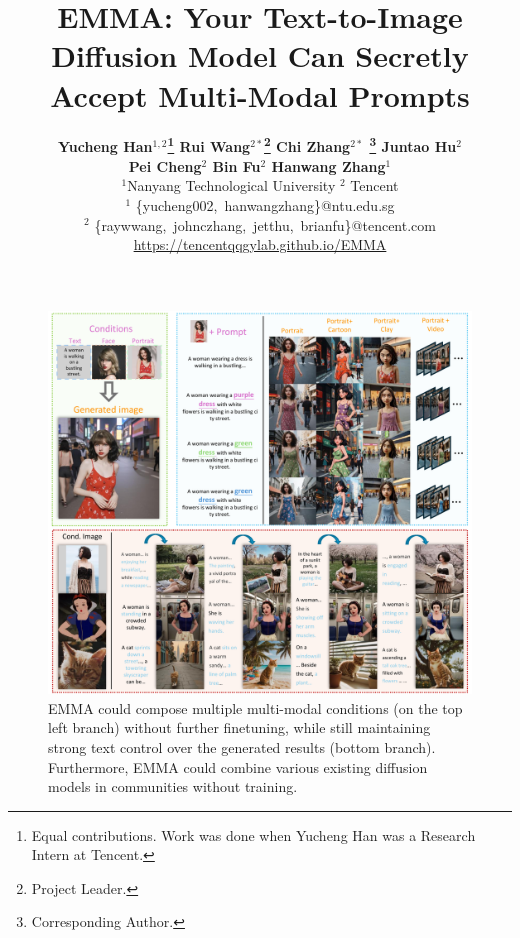 \documentclass{article}
\title{EMMA: Your Text-to-Image Diffusion Model Can Secretly Accept Multi-Modal Prompts
}
\author{\textbf{Yucheng Han$^{1,2}$\thanks{Equal contributions. Work was done when Yucheng Han was a Research Intern at Tencent.} 
\quad
Rui Wang$^{2\ast}$\thanks{Project Leader.}
\quad 
Chi Zhang$^{2\ast}$ \thanks{Corresponding Author. }
\quad Juntao Hu$^{2}$ } \\ \textbf{ Pei Cheng$^2$ \quad Bin Fu$^2$ \quad Hanwang Zhang$^1$ }\vspace{0.3em} \\
{\normalsize $^1$Nanyang Technological University} \quad
{\normalsize $^2$ Tencent} \\
{\normalsize $^1$ \{yucheng002,~hanwangzhang\}@ntu.edu.sg}  \\
{\normalsize $^2$ \{raywwang,~johnczhang,~jetthu,~brianfu\}@tencent.com} \\
\url{https://tencentqqgylab.github.io/EMMA}
}
\begin{document}
\maketitle

\begin{figure}[h]
    \centering
    \includegraphics[width=.95\textwidth]{images/emma_teaser_v2.pdf}
    \caption{EMMA could compose multiple multi-modal conditions (on the top left branch) without further finetuning, while still maintaining strong text control over the generated results (bottom branch). Furthermore, EMMA could combine various existing diffusion models in communities without training.}
    \label{fig:teaser}
\end{figure}













\clearpage
{
    \small
    
    
}

\appendix



\end{document}
